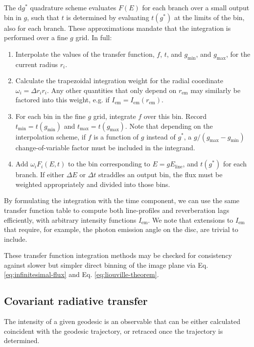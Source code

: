 \documentclass[fleqn,usenatbib]{mnras}
\renewcommand{\d}{\text{d}}
\begin{document}
The $\d g^\ast$ quadrature scheme evaluates $F(E)$ for each branch over a small output bin in $g$, such that $t$ is determined by evaluating $t(g^\ast)$ at the limits of the bin, also for each branch. These approximations mandate that the integration is performed over a fine $g$ grid. In full:
\begin{enumerate}
    \item Interpolate the values of the transfer function, $f$, $t$, and $g_\text{min}$, and $g_\text{max}$, for the current radius $r_i$.
    \item Calculate the trapezoidal integration weight for the radial coordinate $\omega_i = \Delta r_i r_i$. Any other quantities that only depend on $r_\text{em}$ may similarly be factored into this weight, e.g. if $I_\text{em} = I_\text{em}(r_\text{em})$.
    \item For each bin in the fine $g$ grid, integrate $f$ over this bin. Record $t_\text{min} = t(g_\text{min})$ and $t_\text{max} = t(g_\text{max})$. Note that depending on the interpolation scheme, if $f$ is a function of $g$ instead of $g^\ast$, a $g / (g_\text{max} - g_\text{min})$ change-of-variable factor must be included in the integrand.
    \item Add $\omega_i F_i(E, t)$ to the bin corresponding to $E = gE_\text{line}$, and $t(g^\ast)$ for each branch. If either $\Delta E$ or $\Delta t$ straddles an output bin, the flux must be weighted appropriately and divided into those bins.
\end{enumerate}

By formulating the integration with the time component, we can use the same transfer function table to compute both line-profiles and reverberation lags efficiently, with arbitrary intensity functions $I_\text{em}$. We note that extensions to $I_\text{em}$ that require, for example, the photon emission angle on the disc, are trivial to include.

These transfer function integration methods may be checked for consistency against slower but simpler direct binning of the image plane via Eq. \eqref{eq:infinitesimal-flux} and Eq. \eqref{eq:liouville-theorem}.

\subsection{Covariant radiative transfer}

The intensity of a given geodesic is an observable that can be either calculated coincident with the geodesic trajectory, or retraced once the trajectory is determined.
\end{document}
